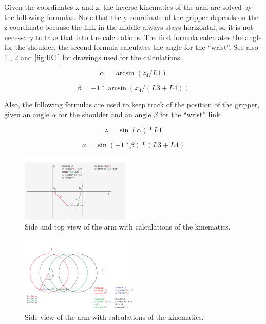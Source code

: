 \documentclass[project_eva.tex]{subfiles}
\begin{document}
Given the coordinates x and z, the inverse kinematics of the arm are solved by the following formulas. Note that the y 
coordinate of the gripper depends on the z coordinate because the link in the middle always stays horizontal, so it is 
not necessary to take that into the calculations. The first formula calculates the angle for the shoulder, the second 
formula calculates the angle for the ``wrist''. See also \ref{fig:IK0} , \ref{fig:IK2} and \ref{fig:IK1} for drawings 
used for the calculations.

\begin{equation*}
\alpha = \arcsin(z_4/L1)
\end{equation*}

\begin{equation*}
\beta = -1 * \arcsin(x_4/(L3 + L4))
\end{equation*}

Also, the following formulas are used to keep track of the position of the gripper, given an angle $\alpha$ for the 
shoulder and an angle $\beta$ for the ``wrist'' link:

\begin{equation*}
z = \sin(\alpha)*L1
\end{equation*}

\begin{equation*}
x = \sin(-1 * \beta)*(L3 + L4)
\end{equation*}

\begin{figure}[h!]
	\centering
	\mbox{\includegraphics[width=0.5\textwidth]{Images/3d_zijenbovenaanzicht.png}}
	\caption{Side and top view of the arm with calculations of the kinematics.}
	\label{fig:IK0}
\end{figure}

\begin{figure}[h]
	\centering
	\mbox{\includegraphics[width=0.5\textwidth]{Images/2d_zijaanzicht.png}}
	\caption{Side view of the arm with calculations of the kinematics.}
	\label{fig:IK2}
\end{figure}
\end{document}
